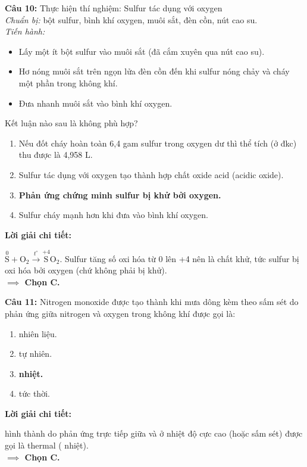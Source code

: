 \documentclass[10.5pt,a4paper]{article}
\newcommand{\loigiai}[1]{%
  \vspace{1pt}
  \begin{tcolorbox}
  {\color{myBlue}\bfseries Lời giải chi tiết:}\par\vspace{1pt}
  {\small #1}
  \end{tcolorbox}
  \vspace{2pt}
}
\begin{document}
\textbf{Câu 10:} Thực hiện thí nghiệm: Sulfur tác dụng với oxygen\\
\textit{Chuẩn bị:} bột sulfur, bình khí oxygen, muôi sắt, đèn cồn, nút cao su.\\
\textit{Tiến hành:}
\begin{itemize}[itemsep=0pt, topsep=1pt, leftmargin=0.8cm]
    \item Lấy một ít bột sulfur vào muôi sắt (đã cắm xuyên qua nút cao su).
    \item Hơ nóng muôi sắt trên ngọn lửa đèn cồn đến khi sulfur nóng chảy và cháy một phần trong không khí.
    \item Đưa nhanh muôi sắt vào bình khí oxygen.
\end{itemize}
Kết luận nào sau là không phù hợp?
\begin{enumerate}[label=\textbf{\Alph*.}, itemsep=1pt, topsep=1pt, leftmargin=1.5cm]
    \item Nếu đốt cháy hoàn toàn 6,4 gam sulfur trong oxygen dư thì thể tích  (ở đkc) thu được là 4,958 L.
    \item Sulfur tác dụng với oxygen tạo thành hợp chất oxide acid (acidic oxide).
    \item \textbf{\color{myRed}Phản ứng chứng minh sulfur bị khử bởi oxygen.}
    \item Sulfur cháy mạnh hơn khi đưa vào bình khí oxygen.
\end{enumerate}
\loigiai{$\overset{0}{\text{S}} + \text{O}_2 \xrightarrow{t^\circ} \overset{+4}{\text{S}}\text{O}_2$. Sulfur tăng số oxi hóa từ 0 lên +4 nên là chất khử, tức sulfur bị oxi hóa bởi oxygen (chứ không phải bị khử).\\ \textbf{$\implies$ Chọn C.}}

\textbf{Câu 11:} Nitrogen monoxide được tạo thành khi mưa dông kèm theo sấm sét do phản ứng giữa nitrogen và oxygen trong không khí được gọi là:
\begin{enumerate}[label=\textbf{\Alph*.}, itemsep=1pt, topsep=1pt, leftmargin=1.5cm]
    \item {} nhiên liệu. \hfill \item {} tự nhiên. \hfill \item \textbf{\color{myRed} nhiệt.} \hfill \item {} tức thời.
\end{enumerate}
\loigiai{ hình thành do phản ứng trực tiếp giữa  và \ce{O2} ở nhiệt độ cực cao (hoặc sấm sét) được gọi là thermal \ce{NO_x} (\ce{NO_x} nhiệt).\\ \textbf{$\implies$ Chọn C.}}
\end{document}
